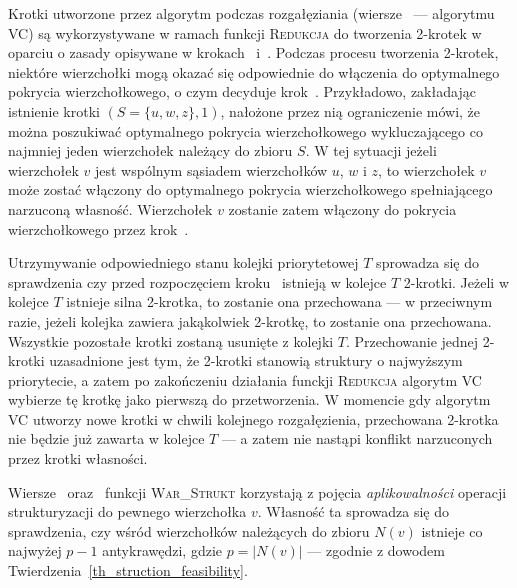 \par{
  Krotki utworzone przez algorytm podczas rozgałęziania (wiersze~ ---  algorytmu \textsc{VC}) są wykorzystywane w ramach funkcji \textsc{Redukcja} do tworzenia 2-krotek w oparciu o zasady opisywane w krokach~ i~.
  Podczas procesu tworzenia 2-krotek, niektóre wierzchołki mogą okazać się odpowiednie do włączenia do optymalnego pokrycia wierzchołkowego, o czym decyduje krok~.
  Przykładowo, zakładając istnienie krotki $(S=\{u, w, z\}, 1)$, nałożone przez nią ograniczenie mówi, że można poszukiwać optymalnego pokrycia wierzchołkowego wykluczającego co najmniej jeden wierzchołek należący do zbioru $S$.
  W tej sytuacji jeżeli wierzchołek $v$ jest wspólnym sąsiadem wierzchołków $u$, $w$ i $z$, to wierzchołek $v$ może zostać włączony do optymalnego pokrycia wierzchołkowego spełniającego narzuconą własność.
  Wierzchołek $v$ zostanie zatem włączony do pokrycia wierzchołkowego przez krok~.

  Utrzymywanie odpowiedniego stanu kolejki priorytetowej $T$ sprowadza się do sprawdzenia czy przed rozpoczęciem kroku~ istnieją w kolejce $T$ 2-krotki.
  Jeżeli w kolejce $T$ istnieje silna 2-krotka, to zostanie ona przechowana --- w przeciwnym razie, jeżeli kolejka zawiera jakąkolwiek 2-krotkę, to zostanie ona przechowana.
  Wszystkie pozostałe krotki zostaną usunięte z kolejki $T$.
  Przechowanie jednej 2-krotki uzasadnione jest tym, że 2-krotki stanowią struktury o najwyższym priorytecie, a zatem po zakończeniu działania funckji \textsc{Redukcja} algorytm \textsc{VC} wybierze tę krotkę jako pierwszą do przetworzenia.
  W momencie gdy algorytm \textsc{VC} utworzy nowe krotki w chwili kolejnego rozgałęzienia, przechowana 2-krotka nie będzie już zawarta w kolejce $T$ --- a zatem nie nastąpi konflikt narzuconych przez krotki własności.

  Wiersze~ oraz~ funkcji \textsc{War\_Strukt} korzystają z pojęcia \emph{aplikowalności} operacji strukturyzacji do pewnego wierzchołka $v$.
  Własność ta sprowadza się do sprawdzenia, czy wśród wierzchołków należących do zbioru $N(v)$ istnieje co najwyżej $p-1$ antykrawędzi, gdzie $p=|N(v)|$ --- zgodnie z dowodem Twierdzenia~\ref{th_struction_feasibility}.
}
